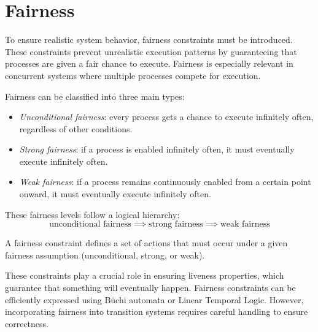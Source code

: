 \section{Fairness}

To ensure realistic system behavior, fairness constraints must be introduced. 
These constraints prevent unrealistic execution patterns by guaranteeing that processes are given a fair chance to execute. 
Fairness is especially relevant in concurrent systems where multiple processes compete for execution.

Fairness can be classified into three main types:
\begin{itemize}
    \item \textit{Unconditional fairness}: every process gets a chance to execute infinitely often, regardless of other conditions.
    \item \textit{Strong fairness}: if a process is enabled infinitely often, it must eventually execute infinitely often.
    \item \textit{Weak fairness}: if a process remains continuously enabled from a certain point onward, it must eventually execute infinitely often.
\end{itemize}
\noindent These fairness levels follow a logical hierarchy:
\[\text{unconditional fairness}\implies\text{strong fairness}\implies\text{weak fairness}\]

\begin{definition}
    A fairness constraint defines a set of actions that must occur under a given fairness assumption (unconditional, strong, or weak).
\end{definition}
\noindent These constraints play a crucial role in ensuring liveness properties, which guarantee that something will eventually happen.
Fairness constraints can be efficiently expressed using Büchi automata or Linear Temporal Logic. 
However, incorporating fairness into transition systems requires careful handling to ensure correctness.

